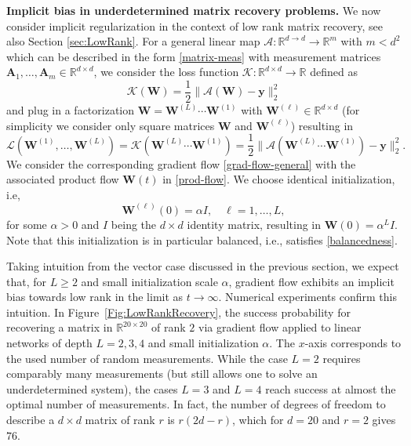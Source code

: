 \documentclass{svproc}
\newcommand{\corr}[1]{#1}
\newcommand{\bA}{\boldsymbol{A}}
\newcommand{\bW}{\boldsymbol{W}}
\newcommand{\by}{\boldsymbol{y}}
\newcommand{\0}{\boldsymbol{0}}
\newcommand{\1}{\boldsymbol{1}}
\def\R{\mathbb{R}}
\begin{document}
\medskip

{\textbf{Implicit bias in underdetermined matrix recovery problems.}} We now consider implicit regularization in the context of low rank matrix recovery, see also Section \ref{sec:LowRank}. For a general linear map $\mathcal{A} : \R^{d \to d} \to \R^m$ with $m < d^2$ which can be described in the form \eqref{matrix-meas} with measurement matrices $\bA_1,\hdots,\bA_m \in \R^{d \times d}$, we consider the loss function $\mathcal{K} : \R^{d \times d} \to \R$ defined as
\[
\mathcal{K}(\bW) = \frac{1}{2} \|\mathcal{A}(\bW)- \by\|_2^2
\]
and plug in a factorization $\bW = \bW^{(L)} \cdots \bW^{(1)}$ with $\bW^{(\ell)} \in \R^{d\times d}$ (for simplicity we consider only square matrices $\bW$ and $\bW^{(\ell)}$) resulting in
\begin{equation}\label{L-factorized}
\mathcal{L}(\bW^{(1)}, \hdots, \bW^{(L)}) = \mathcal{K}(\bW^{(L)}\cdots \bW^{(1)}) = \frac{1}{2} \|\mathcal{A}(\bW^{(L)}\cdots \bW^{(1)}) - \by\|_2^2.
\end{equation}
We consider the corresponding gradient flow \eqref{grad-flow-general} with the associated product flow $\bW(t)$ in \eqref{prod-flow}. We choose identical initialization, i.e,
\begin{equation}\label{init-alpha}
\bW^{(\ell)}(0) = \alpha I, \quad \ell= 1,\hdots, L,
\end{equation}
for some $\alpha > 0$ and $I$ being the $d \times d$ identity matrix, resulting in $\bW(0) = \alpha^L I$.
Note that this initialization is in particular balanced, i.e., satisfies \eqref{balancedness}.

Taking intuition from the vector case discussed in the previous section, we expect that, for $L\geq 2$ and small initialization scale $\alpha$, gradient flow exhibits an implicit bias towards low rank in the limit as $t \to \infty$. Numerical experiments confirm this intuition. In Figure~\ref{Fig:LowRankRecovery}, the success probability for recovering a matrix in $\R^{20 \times 20}$ of rank $2$ via gradient flow applied to linear networks of depth $L=2,3,4$ and small initialization $\alpha$. The $x$-axis corresponds to the used number of random measurements.
While the case $L=2$ requires comparably many measurements (but still allows \corr{one} to solve an underdetermined system), the cases \corr{$L=3$} and $L=4$ reach success at almost the optimal number of measurements. In fact, the number of degrees of freedom to describe a $d \times d$ matrix of rank $r$ is $r(2d-r)$\corr{,} which for $d=20$ and $r=2$ gives $76$.
\end{document}
